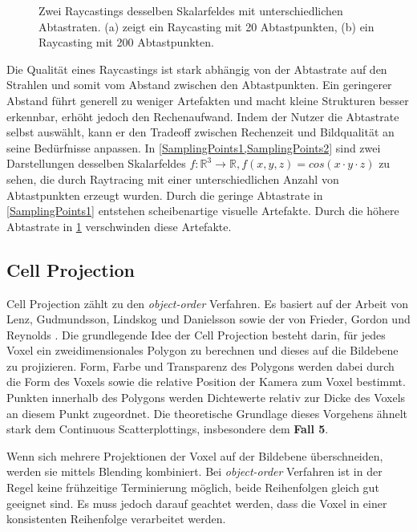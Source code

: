 \documentclass[a4paper,fontsize=12pt,toc=bib,parskip=half,ngerman]{scrartcl}
\begin{document}
\begin{figure}
\begin{minipage}{0.49\textwidth}
\begin{subfigure}{0.7\textwidth}
			\subcaption{}
			\label{SamplingPoints2}
		\end{subfigure}
	\end{minipage}
	\caption{Zwei Raycastings desselben Skalarfeldes mit unterschiedlichen Abtastraten. (a) zeigt ein Raycasting mit 20 Abtastpunkten, (b) ein Raycasting mit 200 Abtastpunkten.}
	\label{SamplingPoints}
\end{figure}

Die Qualit\"at eines Raycastings ist stark abh\"angig von der Abtastrate auf den Strahlen und somit vom Abstand zwischen den Abtastpunkten. Ein geringerer Abstand f\"uhrt generell zu weniger Artefakten und macht kleine Strukturen besser erkennbar, erh\"oht jedoch den Rechenaufwand. Indem der Nutzer die Abtastrate selbst ausw\"ahlt, kann er den Tradeoff zwischen Rechenzeit und Bildqualit\"at an seine Bed\"urfnisse anpassen. In \cref{SamplingPoints1,SamplingPoints2} sind zwei Darstellungen desselben Skalarfeldes $f:\mathbb{R}^3\rightarrow\mathbb{R}, f(x, y, z)=cos(x\cdot y\cdot z)$ zu sehen, die durch Raytracing mit einer unterschiedlichen Anzahl von Abtastpunkten erzeugt wurden. Durch die geringe Abtastrate in \cref{SamplingPoints1} entstehen scheibenartige visuelle Artefakte. Durch die h\"ohere Abtastrate in \cref{SamplingPoints2} verschwinden diese Artefakte.

\subsection{Cell Projection}
Cell Projection z\"ahlt zu den \textit{object-order} Verfahren. Es basiert auf der Arbeit von Lenz, Gudmundsson, Lindskog und Danielsson \cite{lenz86display} sowie der von Frieder, Gordon und Reynolds \cite{frieder1985back}. Die grundlegende Idee der Cell Projection besteht darin, f\"ur jedes Voxel ein zweidimensionales Polygon zu berechnen und dieses auf die Bildebene zu projizieren. Form, Farbe und Transparenz des Polygons werden dabei durch die Form des Voxels sowie die relative Position der Kamera zum Voxel bestimmt. Punkten innerhalb des Polygons werden Dichtewerte relativ zur Dicke des Voxels an diesem Punkt zugeordnet. Die theoretische Grundlage dieses Vorgehens \"ahnelt stark dem Continuous Scatterplottings, insbesondere dem \textbf{Fall 5}.

Wenn sich mehrere Projektionen der Voxel auf der Bildebene \"uberschneiden, werden sie mittels Blending kombiniert. Bei \textit{object-order} Verfahren ist in der Regel keine fr\"uhzeitige Terminierung m\"oglich, beide Reihenfolgen gleich gut geeignet sind. Es muss jedoch darauf geachtet werden, dass die Voxel in einer konsistenten Reihenfolge verarbeitet werden.
\end{document}
